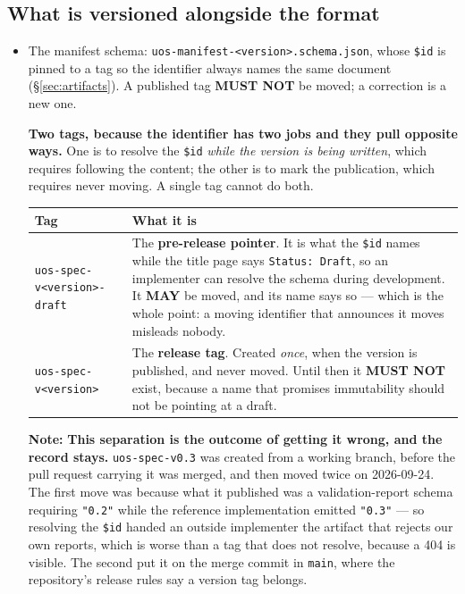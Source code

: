 \documentclass[11pt,a4paper]{article}
\newcommand{\MUSTNOT}{\textcolor{uosred}{\textbf{MUST NOT}}}
\newcommand{\MAY}{\textcolor{uosgreen}{\textbf{MAY}}}
\newcommand{\code}[1]{\texttt{\small #1}}
\begin{document}
\subsection{What is versioned alongside the format}

\begin{itemize}
  \item The manifest schema: \code{uos-manifest-<version>.schema.json}, whose \code{\$id}
  is pinned to a tag so the identifier always names the same document
  (\S\ref{sec:artifacts}). A published tag \MUSTNOT{} be moved; a correction is a new one.

  \textbf{Two tags, because the identifier has two jobs and they pull opposite ways.} One is
  to resolve the \code{\$id} \emph{while the version is being written}, which requires
  following the content; the other is to mark the publication, which requires never moving.
  A single tag cannot do both.

  \begin{longtable}{L{4.6cm} L{10.6cm}}
  \toprule
  \textbf{Tag} & \textbf{What it is}\\
  \midrule
  \endhead
  \code{uos-spec-v<version>-draft} & The \textbf{pre-release pointer}. It is what the
  \code{\$id} names while the title page says \code{Status: Draft}, so an implementer can
  resolve the schema during development. It \MAY{} be moved, and its name says so --- which
  is the whole point: a moving identifier that announces it moves misleads nobody.\\
  \code{uos-spec-v<version>} & The \textbf{release tag}. Created \emph{once}, when the
  version is published, and never moved. Until then it \MUSTNOT{} exist, because a name
  that promises immutability should not be pointing at a draft.\\
  \bottomrule
  \end{longtable}

  \textbf{Note:} \textbf{This separation is the outcome of getting it wrong, and the record stays.}
  \code{uos-spec-v0.3} was created from a working branch, before the pull request carrying it
  was merged, and then moved twice on 2026-09-24. The first move was because what it
  published was a validation-report schema requiring \code{"0.2"} while the reference
  implementation emitted \code{"0.3"} --- so resolving the \code{\$id} handed an outside
  implementer the artifact that rejects our own reports, which is worse than a tag that does
  not resolve, because a 404 is visible. The second put it on the merge commit in
  \code{main}, where the repository's release rules say a version tag belongs.


\end{itemize}
\end{document}
